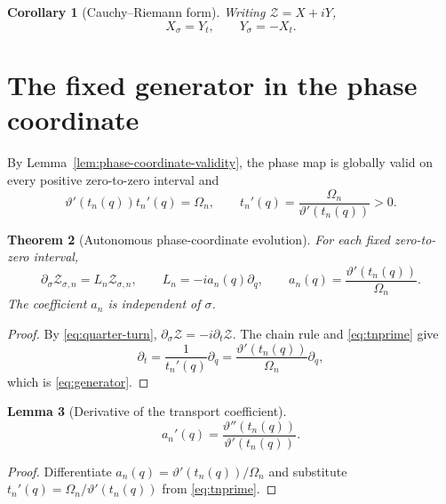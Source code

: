 \documentclass[11pt]{amsart}
\numberwithin{equation}{section}
\newtheorem{theorem}{Theorem}[section]
\newtheorem{corollary}[theorem]{Corollary}
\newtheorem{lemma}[theorem]{Lemma}
\newcommand{\Zcal}{\mathcal Z}
\begin{document}
\begin{corollary}[Cauchy--Riemann form]
Writing $\Zcal=X+iY$,
\begin{equation}
X_\sigma=Y_t,
\qquad
Y_\sigma=-X_t.
\label{eq:CR}
\end{equation}
\end{corollary}

\section{The fixed generator in the phase coordinate}

By Lemma~\ref{lem:phase-coordinate-validity}, the phase map is globally valid on every positive zero-to-zero interval and
\begin{equation}
\vartheta'(t_n(q))t_n'(q)=\Omega_n,
\qquad
t_n'(q)=\frac{\Omega_n}{\vartheta'(t_n(q))}>0.
\label{eq:phase-jacobian}
\end{equation}

\begin{theorem}[Autonomous phase-coordinate evolution]
For each fixed zero-to-zero interval,
\begin{equation}
\boxed{
\partial_\sigma \Zcal_{\sigma,n}
=L_n\Zcal_{\sigma,n},
\qquad
L_n=-ia_n(q)\partial_q,
\qquad
a_n(q)=\frac{\vartheta'(t_n(q))}{\Omega_n}.
}
\label{eq:generator}
\end{equation}
The coefficient $a_n$ is independent of $\sigma$.
\end{theorem}

\begin{proof}
By \eqref{eq:quarter-turn}, $\partial_\sigma\Zcal=-i\partial_t\Zcal$.  The chain rule and \eqref{eq:tnprime} give
\[
\partial_t
=\frac{1}{t_n'(q)}\partial_q
=\frac{\vartheta'(t_n(q))}{\Omega_n}\partial_q,
\]
which is \eqref{eq:generator}.
\end{proof}

\begin{lemma}[Derivative of the transport coefficient]
\begin{equation}
\boxed{
a_n'(q)=\frac{\vartheta''(t_n(q))}{\vartheta'(t_n(q))}.}
\label{eq:aprime}
\end{equation}
\end{lemma}

\begin{proof}
Differentiate $a_n(q)=\vartheta'(t_n(q))/\Omega_n$ and substitute $t_n'(q)=\Omega_n/\vartheta'(t_n(q))$ from \eqref{eq:tnprime}.
\end{proof}
\end{document}
